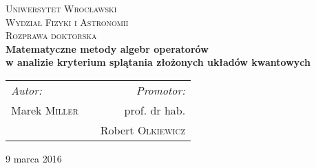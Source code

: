 \begin{titlepage}

\begin{center}

\textsc{\LARGE Uniwersytet Wrocławski}\\[0.5cm]
\textsc{\Large Wydział Fizyki i Astronomii} \\[1.5cm]
\textsc{\Large Rozprawa doktorska} \\[2cm]

{ \Large \bfseries
    Matematyczne metody algebr operatorów\\
    w analizie kryterium splątania
    złożonych układów kwantowych
}\\[3cm]

{ \large
\begin{center}
\begin{tabular}{lcr}
\emph{Autor:} & \hspace{3cm} & \emph{Promotor:}\\
Marek \textsc{Miller} & & prof. dr hab. \\
    & & Robert \textsc{Olkiewicz}
\end{tabular}
\end{center}
}

\vfill


{\large 9 marca 2016}
\end{center}

\end{titlepage}
